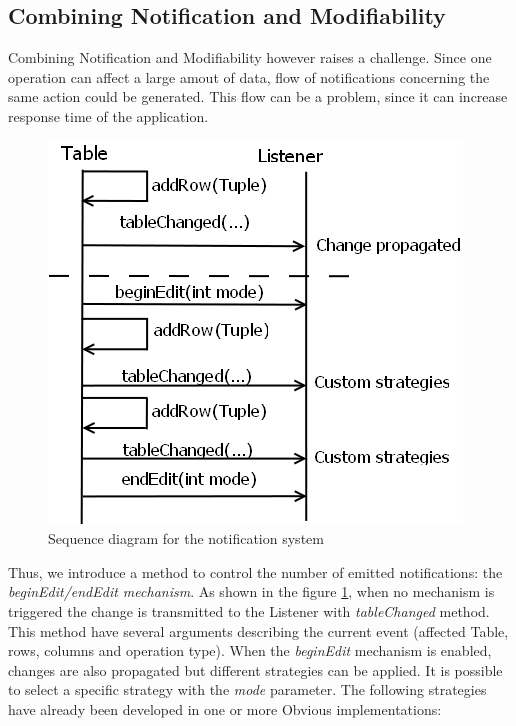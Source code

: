 \subsection{Combining Notification and Modifiability}

Combining Notification and Modifiability however raises a challenge. Since one operation can affect a large amout of data, flow of notifications concerning the same action could be generated. This flow can be a problem, since it can increase response time of the application.

\begin{figure}[!ht]
\includegraphics[width=\columnwidth]{figures/notification}
\caption{Sequence diagram for the notification system}
\label{fig:notification}
\end{figure}

Thus, we introduce a method to control the number of emitted notifications: the \emph{beginEdit/endEdit mechanism}. As shown in the figure \ref{fig:notification}, when no mechanism is triggered the change is transmitted to the Listener with \emph{tableChanged} method. This method have several arguments describing the current event (affected Table, rows, columns and operation type). When the \emph{beginEdit} mechanism is enabled, changes are also propagated but different strategies can be applied. It is possible to select a specific strategy with the \emph{mode} parameter. The following strategies have already been developed  in one or more Obvious implementations:


